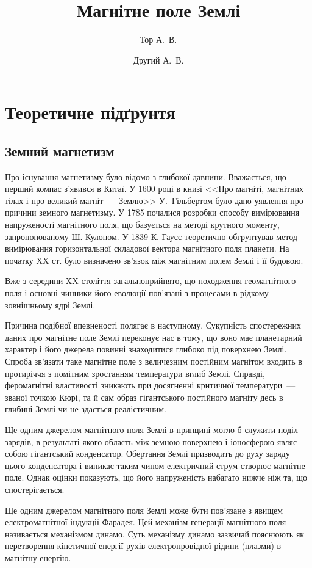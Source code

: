 \documentclass{LabWork}
\title{Магнітне поле Землі}
\author{Тор А.~В.}{}
\author{Другий А.~В.}{}
\begin{document}
\writedatatofile{\jobname}
\maketitle


\section{Теоретичне підґрунтя}
\subsection{Земний магнетизм}

Про існування магнетизму було відомо з глибокої давнини. Вважається, що перший компас з'явився в Китаї. У 1600 році в книзі  <<Про магніті, магнітних тілах і про великий магніт~--- Землю>> У.~Гільбертом  було дано уявлення про причини земного магнетизму. У 1785 почалися розробки способу вимірювання напруженості магнітного поля, що базується на методі крутного моменту, запропонованому Ш. Кулоном. У 1839 К. Гаусс теоретично обгрунтував метод вимірювання горизонтальної складової вектора магнітного поля планети. На початку XX ст. було визначено зв'язок між магнітним полем Землі і її будовою.

Вже з середини XX століття загальноприйнято, що походження геомагнітного поля і основні чинники його еволюції пов'язані з процесами в рідкому зовнішньому ядрі Землі.

Причина подібної впевненості полягає в наступному. Сукупність спостережних даних про магнітне поле Землі переконує нас в тому, що воно має планетарний характер і його джерела повинні знаходитися глибоко під поверхнею Землі. Спроба зв'язати таке магнітне поле з величезним постійним магнітом входить в протиріччя з помітним зростанням температури вглиб Землі. Справді, феромагнітні властивості зникають при досягненні критичної температури~--- званої точкою Кюрі, та й сам образ гігантського постійного магніту десь в глибині Землі чи не здається реалістичним.

Ще одним джерелом магнітного поля Землі в принципі могло б служити поділ зарядів, в результаті якого область між земною поверхнею і іоносферою являє собою гігантський конденсатор. Обертання Землі призводить до руху заряду цього конденсатора і виникає таким чином електричний струм створює магнітне поле. Однак оцінки показують, що його напруженість набагато нижче ніж та, що спостерігається.

Ще одним джерелом магнітного поля Землі може бути пов'язане з явищем електромагнітної індукції Фарадея. Цей механізм генерації магнітного поля називається механізмом динамо. Суть механізму динамо зазвичай пояснюють як перетворення кінетичної енергії рухів електропровідної рідини (плазми) в магнітну енергію.
\end{document}
